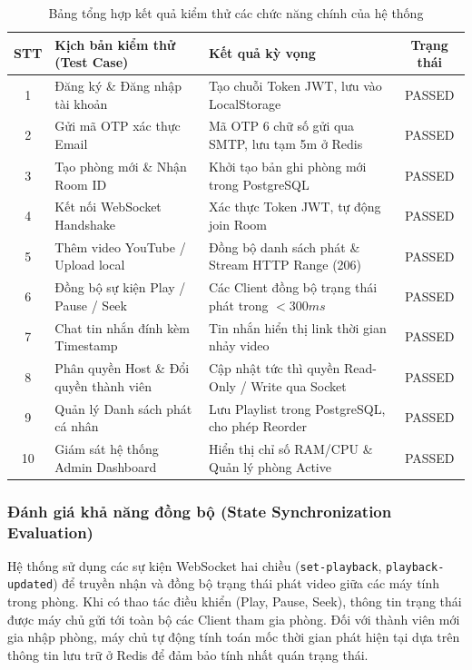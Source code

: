 \documentclass[12pt,a4paper]{extarticle}
\begin{document}
\begin{table}[H]
\centering
\small
\caption{Bảng tổng hợp kết quả kiểm thử các chức năng chính của hệ thống}
\label{tab:test_cases_summary}
\renewcommand{\arraystretch}{1.25}
\begin{tabular}{|c|p{4.8cm}|p{5.2cm}|c|}
\hline
\textbf{STT} & \textbf{Kịch bản kiểm thử (Test Case)} & \textbf{Kết quả kỳ vọng} & \textbf{Trạng thái} \\ \hline
1 & Đăng ký \& Đăng nhập tài khoản & Tạo chuỗi Token JWT, lưu vào LocalStorage & PASSED \\ \hline
2 & Gửi mã OTP xác thực Email & Mã OTP 6 chữ số gửi qua SMTP, lưu tạm 5m ở Redis & PASSED \\ \hline
3 & Tạo phòng mới \& Nhận Room ID & Khởi tạo bản ghi phòng mới trong PostgreSQL & PASSED \\ \hline
4 & Kết nối WebSocket Handshake & Xác thực Token JWT, tự động join Room & PASSED \\ \hline
5 & Thêm video YouTube / Upload local & Đồng bộ danh sách phát \& Stream HTTP Range (206) & PASSED \\ \hline
6 & Đồng bộ sự kiện Play / Pause / Seek & Các Client đồng bộ trạng thái phát trong $<300ms$ & PASSED \\ \hline
7 & Chat tin nhắn đính kèm Timestamp & Tin nhắn hiển thị link thời gian nhảy video & PASSED \\ \hline
8 & Phân quyền Host \& Đổi quyền thành viên & Cập nhật tức thì quyền Read-Only / Write qua Socket & PASSED \\ \hline
9 & Quản lý Danh sách phát cá nhân & Lưu Playlist trong PostgreSQL, cho phép Reorder & PASSED \\ \hline
10 & Giám sát hệ thống Admin Dashboard & Hiển thị chỉ số RAM/CPU \& Quản lý phòng Active & PASSED \\ \hline
\end{tabular}
\end{table}


\subsubsection{Đánh giá khả năng đồng bộ (State Synchronization Evaluation)}
Hệ thống sử dụng các sự kiện WebSocket hai chiều (\texttt{set-playback}, \texttt{playback-updated}) để truyền nhận và đồng bộ trạng thái phát video giữa các máy tính trong phòng. Khi có thao tác điều khiển (Play, Pause, Seek), thông tin trạng thái được máy chủ gửi tới toàn bộ các Client tham gia phòng. Đối với thành viên mới gia nhập phòng, máy chủ tự động tính toán mốc thời gian phát hiện tại dựa trên thông tin lưu trữ ở Redis để đảm bảo tính nhất quán trạng thái.
\end{document}
